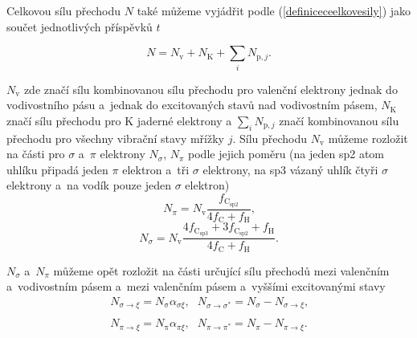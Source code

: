 Celkovou sílu přechodu $N$ také můžeme vyjádřit podle (\ref{definiceceelkovesily}) jako součet jednotlivých příspěvků $t$

\begin{equation}
N = N_\mathrm{v} + N_\mathrm{K} + \sum_i N_{\mathrm{p},j} \text{.}
\end{equation}

$N_\mathrm{v}$ zde značí sílu kombinovanou sílu přechodu pro valenční elektrony jednak do vodivostního pásu a~jednak do excitovaných stavů nad vodivostním pásem, $N_\mathrm{K}$ značí sílu přechodu pro K jaderné elektrony a $\sum_i N_{\mathrm{p},j}$ značí kombinovanou sílu přechodu pro všechny vibrační stavy mřížky $j$. Sílu přechodu $N_\mathrm{v}$ můžeme rozložit na části pro $\sigma$ a~$\pi$ elektrony $N_\sigma$, $N_\pi$ podle jejich poměru (na jeden sp2 atom uhlíku připadá jeden $\pi$ elektron a~tři $\sigma$ elektrony, na sp3 vázaný uhlík čtyři $\sigma$ elektrony a~na vodík pouze jeden $\sigma$  elektron)
\begin{equation}
N_\pi = N_\mathrm{v} \frac{f_\mathrm{C_{sp2}}}{4f_\mathrm{C} + f_\mathrm{H}}  \text{,}
\end{equation}
\begin{equation}
N_\sigma = N_\mathrm{v} \frac{4f_\mathrm{C_{sp3}} + 3f_\mathrm{C_{sp2}} + f_\mathrm{H}}{4f_\mathrm{C} + f_\mathrm{H}}  \text{.}
\end{equation}

$N_\sigma$ a~$N_\pi$ můžeme opět rozložit na části určující sílu přechodů mezi valenčním a~vodivostním pásem a~mezi valenčním pásem a~vyššími excitovanými stavy
\begin{equation}
\begin{array}{lr}
N_{\sigma \rightarrow \xi} = N_\mathrm{\sigma} \alpha_{\sigma\xi} \text{,} &
N_{\sigma \rightarrow \sigma^*} = N_\sigma - N_{\sigma \rightarrow \xi} \text{,} \\
\end{array}
\end{equation}
\begin{equation}
\begin{array}{lr}
N_{\pi \rightarrow \xi} = N_\mathrm{\pi} \alpha_{\pi\xi} \text{,} &
N_{\pi \rightarrow \pi^*} = N_\pi - N_{\pi \rightarrow \xi} \text{.} \\
\end{array}
\end{equation}

